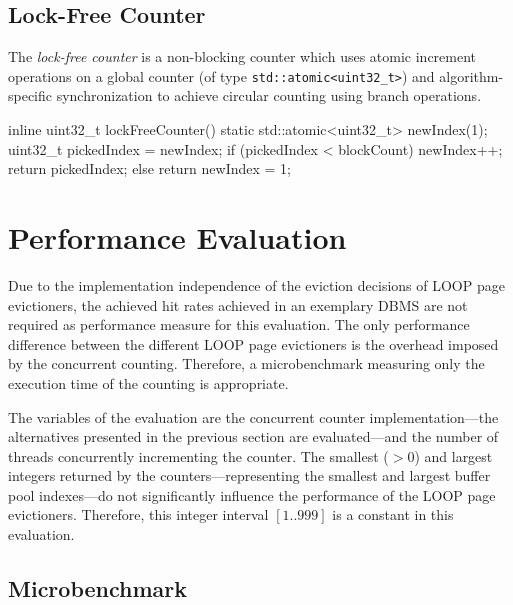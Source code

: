 \subsection[Lock-Free Counter]{Lock-Free Counter} \label{subsec:clunky_counter}

    The \emph{lock-free counter} is a non-blocking counter which uses atomic increment operations on a global counter (of type \lstinline{std::atomic<uint32_t>}) and algorithm-specific synchronization to achieve circular counting using branch operations.

\begin{@empty}
    \lstset{
        language = [ISO]C++
    }
\begin{centeredshadowboxlisting}
inline uint32_t lockFreeCounter() {
    static std::atomic<uint32_t> newIndex(1);
    uint32_t pickedIndex = newIndex;
    if (pickedIndex < blockCount) {
        newIndex++;
        return pickedIndex;
    } else {
        return newIndex = 1;
    }
}
\end{centeredshadowboxlisting}
\end{@empty}

\section[Performance Evaluation]{Performance Evaluation} \label{sec:loop-performance}

    Due to the implementation independence of the eviction decisions of LOOP page evictioners, the achieved hit rates achieved in an exemplary DBMS are not required as performance measure for this evaluation. The only performance difference between the different LOOP page evictioners is the overhead imposed by the concurrent counting. Therefore, a microbenchmark measuring only the execution time of the counting is appropriate.

    The variables of the evaluation are the concurrent counter implementation---the alternatives presented in the previous section are evaluated---and the number of threads concurrently incrementing the counter. The smallest ($>0$) and largest integers returned by the counters---representing the smallest and largest buffer pool indexes---do not significantly influence the performance of the LOOP page evictioners. Therefore, this integer interval $\left[1 .. 999\right]$ is a constant in this evaluation.

\subsection[Microbenchmark]{Microbenchmark}


